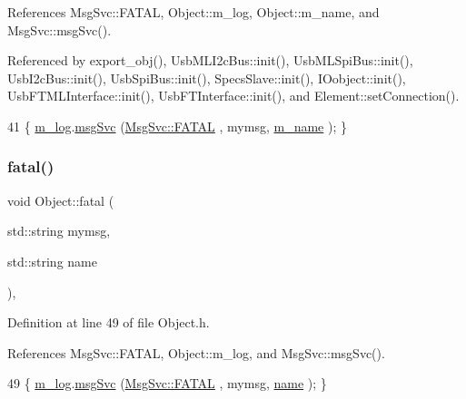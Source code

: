 References Msg\+Svc\+::\+F\+A\+T\+AL, Object\+::m\+\_\+log, Object\+::m\+\_\+name, and Msg\+Svc\+::msg\+Svc().



Referenced by export\+\_\+obj(), Usb\+M\+L\+I2c\+Bus\+::init(), Usb\+M\+L\+Spi\+Bus\+::init(), Usb\+I2c\+Bus\+::init(), Usb\+Spi\+Bus\+::init(), Specs\+Slave\+::init(), I\+Oobject\+::init(), Usb\+F\+T\+M\+L\+Interface\+::init(), Usb\+F\+T\+Interface\+::init(), and Element\+::set\+Connection().


\begin{DoxyCode}
41 \{ \hyperlink{classObject_a0d269813dd7ac1f24bc143031e2963f2}{m\_log}.\hyperlink{classMsgSvc_ad25f18047920cc59a314e5098259711c}{msgSvc} (\hyperlink{classMsgSvc_ae671eb7301996cd049d2da8a65925926a59c73cb29edfc9cdf35845e2b1301363}{MsgSvc::FATAL}   , mymsg, \hyperlink{classObject_a8b83c95c705d2c3ba0d081fe1710f48d}{m\_name} ); \}
\end{DoxyCode}
\mbox{\label{classObject_ae62acd3d09f716220f75f252dc38bc9a}} 
\subsubsection{\texorpdfstring{fatal()}{fatal()}\hspace{0.1cm}{\footnotesize\ttfamily [2/2]}}
{\footnotesize\ttfamily void Object\+::fatal (\begin{DoxyParamCaption}\item[{std\+::string}]{mymsg,  }\item[{std\+::string}]{name }\end{DoxyParamCaption})\hspace{0.3cm}{\ttfamily [inline]}, {\ttfamily [inherited]}}



Definition at line 49 of file Object.\+h.



References Msg\+Svc\+::\+F\+A\+T\+AL, Object\+::m\+\_\+log, and Msg\+Svc\+::msg\+Svc().


\begin{DoxyCode}
49 \{ \hyperlink{classObject_a0d269813dd7ac1f24bc143031e2963f2}{m\_log}.\hyperlink{classMsgSvc_ad25f18047920cc59a314e5098259711c}{msgSvc} (\hyperlink{classMsgSvc_ae671eb7301996cd049d2da8a65925926a59c73cb29edfc9cdf35845e2b1301363}{MsgSvc::FATAL}   , mymsg, \hyperlink{classObject_a300f4c05dd468c7bb8b3c968868443c1}{name} ); \}
\end{DoxyCode}
\mbox{\label{classProcessus_aba93d691f031bdb18ae4b8afb1b2e856}} 
